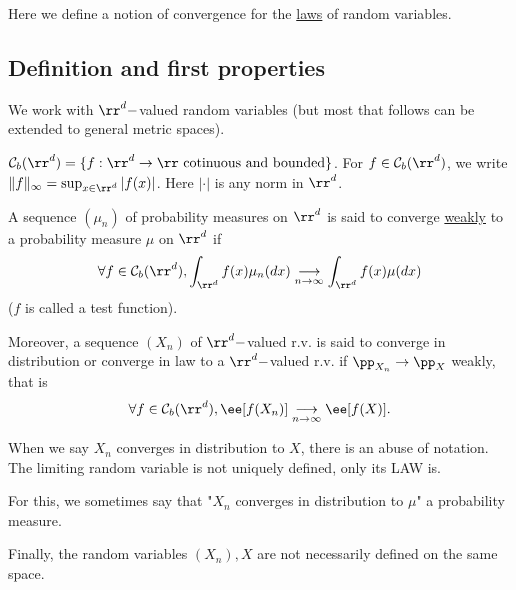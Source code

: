 \documentclass[../main.tex]{subfiles}
\begin{document}
Here we define a notion of convergence for the \underline{laws} of random
variables.


\subsection{Definition and first properties}

We work with $\rr^d-$valued random variables (but most that follows can be
extended to general metric spaces).

\begin{notation}
  $\mathcal{C}_b(\rr^d) = \{ f: \rr^d \to \rr \text{ cotinuous and bounded}\}
  $. For $f \in \mathcal{C}_b(\rr^d)$, we write $\| f \|_{\infty} = \sup_{x
  \in \rr^d} |f(x)|$. Here $|\cdot|$ is any norm in $\rr^d$.
\end{notation}

\begin{definition}
  A sequence $(\mu_n)$ of probability measures on $\rr^d$ is said to converge
  \underline{weakly} to a probability measure $\mu$ on $\rr^d$ if $$\forall f
  \in \mathcal{C}_b(\rr^d), \int_{\rr^d} f(x)\mu_n(dx) \underset{n \to \infty}{\longrightarrow} \int_{\rr^d}
  f(x)\mu(dx) $$
  ($f$ is called a test function).

  Moreover, a sequence $(X_n)$ of $\rr^d-$valued r.v. is said to converge in
  distribution or converge in law to a $\rr^d-$valued r.v. if $\pp_{X_n} \to
  \pp_X$ weakly, that is
  \[
    \forall f \in \mathcal{C}_b(\rr^d), \ee[f(X_n)] \underset{n \to
    \infty}{\longrightarrow}\ee[f(X)]
  .\] 
\end{definition}
\begin{remark}
    When we say $X_n$ converges in distribution to $X$, there is an abuse of
    notation. The limiting random variable is not uniquely defined, only its
    LAW is.

    For this, we sometimes say that "$X_n$ converges in distribution to $\mu$"
    a probability measure.

    Finally, the random variables $(X_n), X$ are not necessarily defined on
    the same space.
\end{remark}
\end{document}
